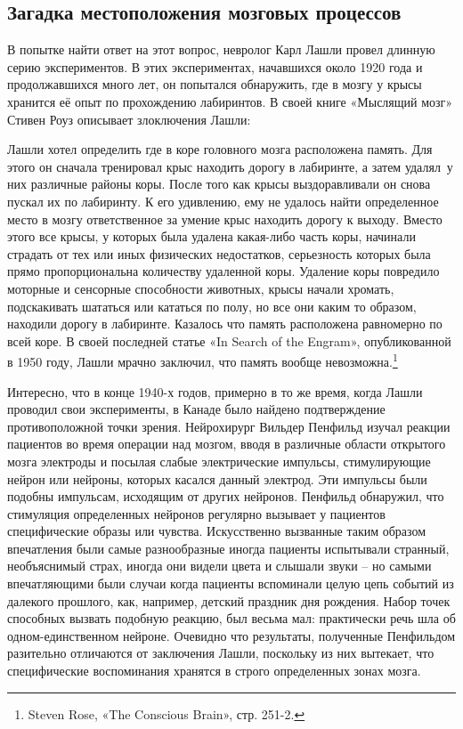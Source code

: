 \documentclass[../main.tex]{subfiles}
\begin{document}
\subsection{Загадка местоположения мозговых процессов}

В попытке найти ответ на этот вопрос, невролог Карл Лашли провел длинную серию экспериментов. В этих экспериментах, начавшихся около 1920 года и продолжавшихся много лет, он попытался обнаружить, где в мозгу у крысы хранится её опыт по прохождению лабиринтов. В своей книге «Мыслящий мозг» Стивен Роуз описывает злоключения Лашли:

Лашли хотел определить где в коре головного мозга расположена память. Для этого он сначала тренировал крыс находить дорогу в лабиринте, а затем удалял~у них различные районы коры. После того как крысы выздоравливали он снова пускал их по лабиринту. К его удивлению, ему не удалось найти определенное место в мозгу ответственное за умение крыс находить дорогу к выходу. Вместо этого все крысы, у которых была удалена какая-либо часть коры, начинали страдать от тех или иных физических недостатков, серьезность которых была прямо пропорциональна количеству удаленной коры. Удаление коры повредило моторные и сенсорные способности животных, крысы начали хромать, подскакивать шататься или кататься по полу, но все они каким то образом, находили дорогу в лабиринте. Казалось что память расположена равномерно по всей коре. В своей последней статье «In Search of the Engram», опубликованной в 1950 году, Лашли мрачно заключил, что память вообще невозможна.\footnote{Steven Rose, «The Conscious Brain», стр. 251-2.}

Интересно, что в конце 1940-х годов, примерно в то же время, когда Лашли проводил свои эксперименты, в Канаде было найдено подтверждение противоположной точки зрения. Нейрохирург Вильдер Пенфильд изучал реакции пациентов во время операции над мозгом, вводя в различные области открытого мозга электроды и посылая слабые электрические импульсы, стимулирующие нейрон или нейроны, которых касался данный электрод. Эти импульсы были подобны импульсам, исходящим от других нейронов. Пенфильд обнаружил, что стимуляция определенных нейронов регулярно вызывает у пациентов специфические образы или чувства. Искусственно вызванные таким образом впечатления были самые разнообразные иногда пациенты испытывали странный, необъяснимый страх, иногда они видели цвета и слышали звуки \--- но самыми впечатляющими были случаи когда пациенты вспоминали целую цепь событий из далекого прошлого, как, например, детский праздник дня рождения. Набор точек способных вызвать подобную реакцию, был весьма мал: практически речь шла об одном-единственном нейроне. Очевидно что результаты, полученные Пенфильдом разительно отличаются от заключения Лашли, поскольку из них вытекает, что специфические воспоминания хранятся в строго определенных зонах мозга.
\end{document}

